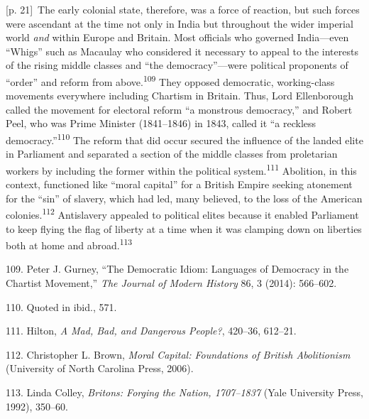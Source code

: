 \documentclass[10pt,a4paper]{article}
\begin{document}
{\scriptsize\color{gray} [p. 21]}\ The early colonial state, therefore, was a force of reaction, but such forces were ascendant at the time not only in India but throughout the wider imperial world \textit{and} within Europe and Britain. Most officials who governed India—even “Whigs” such as Macaulay who considered it necessary to appeal to the interests of the rising middle classes and “the democracy”—were political proponents of “order” and reform from above.\nobreak\textsuperscript{109} They opposed democratic, working-class movements everywhere including Chartism in Britain. Thus, Lord Ellenborough called the movement for electoral reform “a monstrous democracy,” and Robert Peel, who was Prime Minister (1841–1846) in 1843, called it “a reckless democracy.”\nobreak\textsuperscript{110} The reform that did occur secured the influence of the landed elite in Parliament and separated a section of the middle classes from proletarian workers by including the former within the political system.\nobreak\textsuperscript{111} Abolition, in this context, functioned like “moral capital” for a British Empire seeking atonement for the “sin” of slavery, which had led, many believed, to the loss of the American colonies.\nobreak\textsuperscript{112} Antislavery appealed to political elites because it enabled Parliament to keep flying the flag of liberty at a time when it was clamping down on liberties both at home and abroad.\nobreak\textsuperscript{113}\par{\small 109. Peter J. Gurney, “The Democratic Idiom: Languages of Democracy in the Chartist Movement,” \textit{The Journal of Modern History} 86, 3 (2014): 566–602.\par}{\small 110. Quoted in ibid., 571.\par}{\small 111. Hilton, \textit{A Mad, Bad, and Dangerous People?}, 420–36, 612–21.\par}{\small 112. Christopher L. Brown, \textit{Moral Capital: Foundations of British Abolitionism} (University of North Carolina Press, 2006).\par}{\small 113. Linda Colley, \textit{Britons: Forging the Nation, 1707–1837} (Yale University Press, 1992), 350–60.\par}
\end{document}
